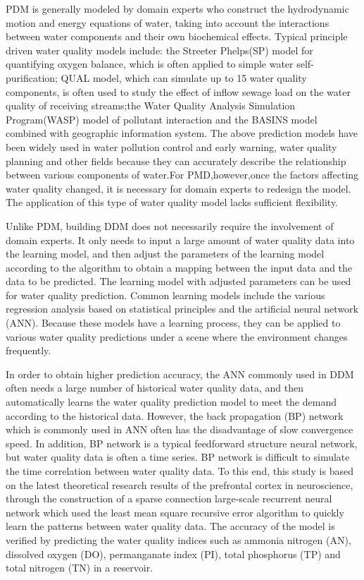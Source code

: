 \documentclass[runningheads]{llncs}
\begin{document}
PDM is generally modeled by domain experts who construct 
the hydrodynamic motion and energy equations of water, 
taking into account the interactions between water components 
and their own biochemical effects\cite{RN5,RN6}.
Typical principle driven water quality models include: the Streeter Phelps(SP) 
model for quantifying oxygen balance\cite{RN7}, which is often 
applied to simple water self-purification; 
QUAL model, which can simulate up to 15 water quality components, 
is often used to study the effect of inflow sewage load on the water quality 
of receiving streams;the Water Quality Analysis Simulation Program(WASP) 
model of pollutant interaction\cite{RN6} and the BASINS model combined with geographic 
information system\cite{RN5,RN8}. The above prediction models have been widely used 
in water pollution control and early warning, water quality planning and 
other fields because they can accurately describe the relationship between 
various components of water.For PMD,however,once the factors affecting water quality changed,
it is necessary for domain experts to redesign the model. 
The application of this type of water quality model lacks sufficient flexibility.

Unlike PDM, building DDM does not necessarily require the involvement of domain experts. 
It only needs to input a large amount of water quality data into the learning model, 
and then adjust the parameters of the learning model according to the algorithm
to obtain a mapping between the input data and the data to be predicted. 
The learning model with adjusted parameters can be used for water quality prediction.
Common learning models include the various 
regression analysis based on statistical principles\cite{RN9,RN10,RN11,RN12} and the artificial
neural network (ANN)\cite{RN13,RN14,RN15,RN16,RN17,RN18}. Because these models have a 
learning process, they can be applied to various water quality 
predictions under a scene where the environment changes frequently.

In order to obtain higher prediction accuracy, the ANN 
commonly used in DDM often needs a large number of historical 
water quality data, and then automatically learns the water 
quality prediction model to meet the demand according 
to the historical data. However, the back propagation (BP) 
network which is commonly used in ANN often has the 
disadvantage of slow convergence speed. In addition, BP network is 
a typical feedforward structure neural network, but water quality data 
is often a time series\cite{RN19}. BP network is difficult to simulate the time 
correlation between water quality data. 
To this end, this study is based on the latest theoretical research results of the prefrontal 
cortex in neuroscience\cite{RN20,RN21}, through the construction of a sparse connection 
large-scale recurrent neural network which used the least mean 
square recursive error algorithm to quickly learn the patterns between water quality data.
The accuracy of the model is verified by predicting the water quality 
indices such as ammonia nitrogen (AN), dissolved oxygen (DO), permanganate index (PI), 
total phosphorus (TP) and total nitrogen (TN) in a reservoir.
\end{document}
